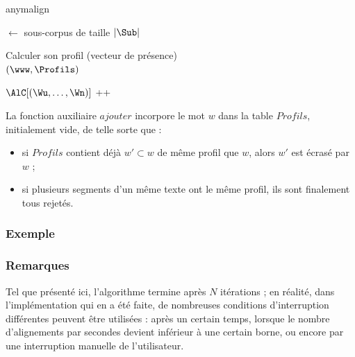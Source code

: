 \documentclass[a4paper,10pt]{article}
\begin{document}
\begin{algorithm}
\caption{anymalign \label{algoanym}}


\Debut
{
	{
		\Sub $\leftarrow$ sous-corpus de taille $|\Sub|$

		{
			{
				Calculer son profil (vecteur de présence) \\
				\ajouter$(\www,\Profils)$
			}

			{
				{

					$\AlC[(\Wu,\dots,\Wn)]$ ++
				}
			}
		}
	}
	\Retour \AlC
}
\end{algorithm}

La fonction auxiliaire $ajouter$ incorpore le mot $w$ dans la table $Profils$, initialement vide, de telle sorte que :

\begin{itemize}
\item si $Profils$ contient déjà $w'\subset w$ de même profil que $w$, alors $w'$ est écrasé par $w$ ;
\item si plusieurs segments d'un même texte ont le même profil, ils sont finalement tous rejetés.
\end{itemize}


\subsubsection{Exemple}

\subsubsection{Remarques}

Tel que présenté ici, l'algorithme termine après $N$ itérations ; en réalité, dans l'implémentation qui en a été faite, de nombreuses conditions d'interruption différentes peuvent être utilisées : après un certain temps, lorsque le nombre d'alignements par secondes devient inférieur à une certain borne, ou encore par une interruption manuelle de l'utilisateur.
\end{document}
